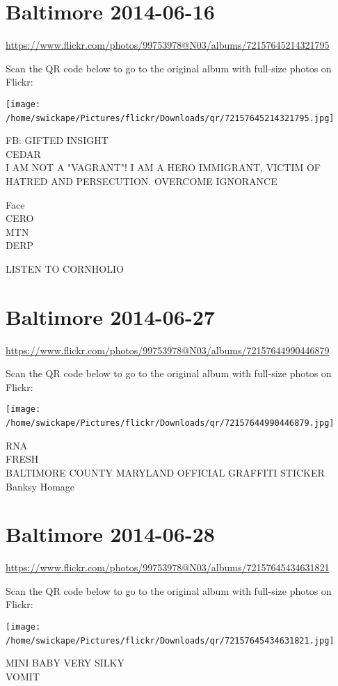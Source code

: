 \documentclass[10pt,letterpaper]{article}
\begin{document}
\section*{Baltimore 2014-06-16}

\url{https://www.flickr.com/photos/99753978@N03/albums/72157645214321795}

Scan the QR code below to go to the original album with full-size photos on Flickr:

\texttt{[image: /home/swickape/Pictures/flickr/Downloads/qr/72157645214321795.jpg]}
\

FB: GIFTED INSIGHT\\
CEDAR\\
I AM NOT A "VAGRANT"!  I AM A HERO IMMIGRANT, VICTIM OF HATRED AND PERSECUTION.  OVERCOME IGNORANCE

Face\\
CERO\\
MTN\\
DERP

LISTEN TO CORNHOLIO
\

\section*{Baltimore 2014-06-27}

\url{https://www.flickr.com/photos/99753978@N03/albums/72157644990446879}

Scan the QR code below to go to the original album with full-size photos on Flickr:

\texttt{[image: /home/swickape/Pictures/flickr/Downloads/qr/72157644990446879.jpg]}
\

RNA\\
FRESH\\
BALTIMORE COUNTY MARYLAND OFFICIAL GRAFFITI STICKER\\
Banksy Homage
\

\section*{Baltimore 2014-06-28}

\url{https://www.flickr.com/photos/99753978@N03/albums/72157645434631821}

Scan the QR code below to go to the original album with full-size photos on Flickr:

\texttt{[image: /home/swickape/Pictures/flickr/Downloads/qr/72157645434631821.jpg]}
\

MINI BABY VERY SILKY\\
VOMIT
\end{document}

